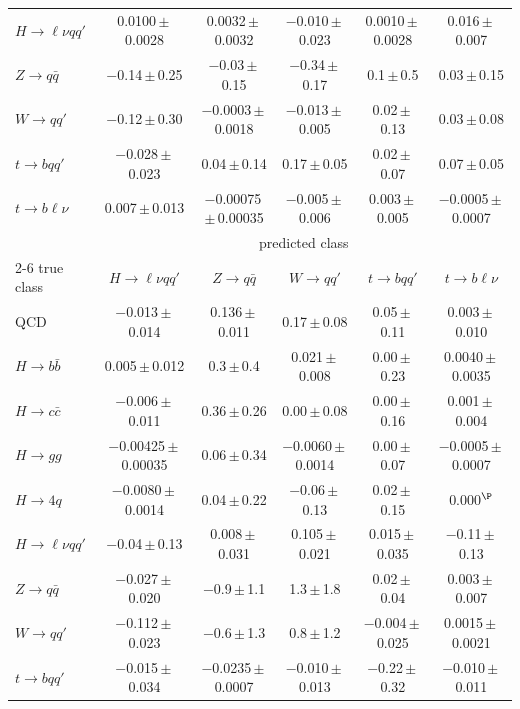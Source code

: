 \begin{landscape}
{\begin{center}
\begin{minipage}{\linewidth}
\begin{tabular*}{\linewidth}{@{\extracolsep{\fill}}lccccc@{}}
$H\to \ell\nu qq'$ & 0.0100\,$\pm$\,0.0028 & 0.0032\,$\pm$\,0.0032 & $-$0.010\,$\pm$\,0.023 & 0.0010\,$\pm$\,0.0028 & 0.016\,$\pm$\,0.007 \\
$Z\to q\bar q$ & $-$0.14\,$\pm$\,0.25 & $-$0.03\,$\pm$\,0.15 & $-$0.34\,$\pm$\,0.17 & 0.1\,$\pm$\,0.5 & 0.03\,$\pm$\,0.15 \\
$W\to qq'$ & $-$0.12\,$\pm$\,0.30 & $-$0.0003\,$\pm$\,0.0018 & $-$0.013\,$\pm$\,0.005 & 0.02\,$\pm$\,0.13 & 0.03\,$\pm$\,0.08 \\
$t\to bqq'$ & $-$0.028\,$\pm$\,0.023 & 0.04\,$\pm$\,0.14 & 0.17\,$\pm$\,0.05 & 0.02\,$\pm$\,0.07 & 0.07\,$\pm$\,0.05 \\
$t\to b\ell\nu$ & 0.007\,$\pm$\,0.013 & $-$0.00075\,$\pm$\,0.00035 & $-$0.005\,$\pm$\,0.006 & 0.003\,$\pm$\,0.005 & $-$0.0005\,$\pm$\,0.0007 \\
\midrule
 & \multicolumn{5}{c}{predicted class} \\
\cmidrule(lr){2-6}
true class & $H\to \ell\nu qq'$ & $Z\to q\bar q$ & $W\to qq'$ & $t\to bqq'$ & $t\to b\ell\nu$ \\
\midrule
QCD & $-$0.013\,$\pm$\,0.014 & 0.136\,$\pm$\,0.011 & 0.17\,$\pm$\,0.08 & 0.05\,$\pm$\,0.11 & 0.003\,$\pm$\,0.010 \\
$H\to b\bar b$ & 0.005\,$\pm$\,0.012 & 0.3\,$\pm$\,0.4 & 0.021\,$\pm$\,0.008 & 0.00\,$\pm$\,0.23 & 0.0040\,$\pm$\,0.0035 \\
$H\to c\bar c$ & $-$0.006\,$\pm$\,0.011 & 0.36\,$\pm$\,0.26 & 0.00\,$\pm$\,0.08 & 0.00\,$\pm$\,0.16 & 0.001\,$\pm$\,0.004 \\
$H\to gg$ & $-$0.00425\,$\pm$\,0.00035 & 0.06\,$\pm$\,0.34 & $-$0.0060\,$\pm$\,0.0014 & 0.00\,$\pm$\,0.07 & $-$0.0005\,$\pm$\,0.0007 \\
$H\to 4q$ & $-$0.0080\,$\pm$\,0.0014 & 0.04\,$\pm$\,0.22 & $-$0.06\,$\pm$\,0.13 & 0.02\,$\pm$\,0.15 & 0.000$^{\P}$ \\
$H\to \ell\nu qq'$ & $-$0.04\,$\pm$\,0.13 & 0.008\,$\pm$\,0.031 & 0.105\,$\pm$\,0.021 & 0.015\,$\pm$\,0.035 & $-$0.11\,$\pm$\,0.13 \\
$Z\to q\bar q$ & $-$0.027\,$\pm$\,0.020 & $-$0.9\,$\pm$\,1.1 & 1.3\,$\pm$\,1.8 & 0.02\,$\pm$\,0.04 & 0.003\,$\pm$\,0.007 \\
$W\to qq'$ & $-$0.112\,$\pm$\,0.023 & $-$0.6\,$\pm$\,1.3 & 0.8\,$\pm$\,1.2 & $-$0.004\,$\pm$\,0.025 & 0.0015\,$\pm$\,0.0021 \\
$t\to bqq'$ & $-$0.015\,$\pm$\,0.034 & $-$0.0235\,$\pm$\,0.0007 & $-$0.010\,$\pm$\,0.013 & $-$0.22\,$\pm$\,0.32 & $-$0.010\,$\pm$\,0.011 \\

\end{tabular*}
\end{minipage}
\end{center}}
\end{landscape}
